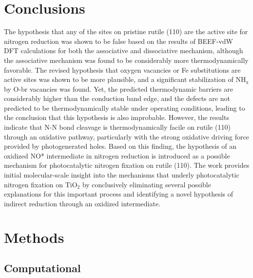\documentclass[journal=ascecg,manuscript=article,articletitle=true]{achemso}
\begin{document}
\section{Conclusions}


The hypothesis that any of the sites on pristine rutile (110) are the active site for nitrogen reduction was shown to be false based on the results of BEEF-vdW DFT calculations for both the associative and dissociative mechanism, although the associative mechanism was found to be considerably more thermodynamically favorable. The revised hypothesis that oxygen vacancies or Fe substitutions are active sites was shown to be more plausible, and a significant stabilization of NH$_{\mathrm{x}}$ by O-br vacancies was found. Yet, the predicted thermodynamic barriers are considerably higher  than the conduction band edge, and the defects are not predicted to be thermodynamically stable under operating conditions, leading to the conclusion that this hypothesis is also improbable. However, the results indicate that N-N bond cleavage is thermodynamically facile on rutile (110) through an oxidative pathway, particularly with the strong oxidative driving force provided by photogenerated holes. Based on this finding, the hypothesis of an oxidized NO* intermediate in nitrogen reduction is introduced as a possible mechanism for photocatalytic nitrogen fixation on rutile (110). The work provides initial molecular-scale insight into the mechanisms that underly photocatalytic nitrogen fixation on TiO$_2$ by conclusively eliminating several possible explanations for this important process and identifying a novel hypothesis of indirect reduction through an oxidized intermediate.

\section{Methods}
\label{sec:methods}
\subsection{Computational}
\end{document}
